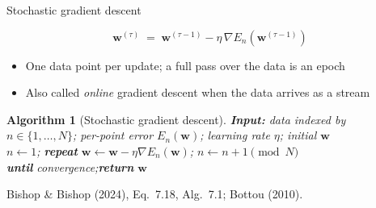 \documentclass[aspectratio=169, 11pt]{beamer}
\newtheorem{algox}[theorem]{Algorithm}
\newcommand{\srcline}[1]{%
  \par\vspace{0.25em}%
  {\scriptsize\color{mcMuted}\hfill #1\par}}
\newcommand{\src}[3]{}      %
\begin{document}
\begin{frame}{Stochastic gradient descent}
  \src{bishop2024}{equation}{7.18}
  \src{bishop2024}{algorithm}{7.1}
  \src{bishop2024}{section}{7.2.3}
  \src{bottou2010}{equation}{4}
  \src{bottou2010}{section}{2.2}
  \vspace{-0.3em}
  \[
    \mathbf{w}^{(\tau)} \;=\; \mathbf{w}^{(\tau-1)}
      - \eta\, \nabla E_n\!\left(\mathbf{w}^{(\tau-1)}\right)
  \]
  \vspace{-0.85em}
  \begin{itemize}\itemsep0.3em
    \item One data point per update; a full pass over the data is an
          \alert{epoch}
    \item Also called \emph{online} gradient descent when the data
          arrives as a stream
  \end{itemize}
  \vspace{0.35em}
  \begin{algox}[Stochastic gradient descent]\label{th:sgd}
    \small
    \textbf{Input:} data indexed by $n \in \{1,\dots,N\}$; per-point
    error $E_n(\mathbf{w})$; learning rate $\eta$; initial $\mathbf{w}$\\[0.25em]
    $n \leftarrow 1$;\quad
    \textbf{repeat}\quad
      $\mathbf{w} \leftarrow \mathbf{w} - \eta \nabla E_n(\mathbf{w})$;\quad
      $n \leftarrow n + 1 \pmod N$\\
    \textbf{until} convergence;\quad \textbf{return} $\mathbf{w}$
  \end{algox}
  \srcline{Bishop \& Bishop (2024), Eq.~7.18, Alg.~7.1; Bottou (2010).}
\end{frame}
\end{document}
